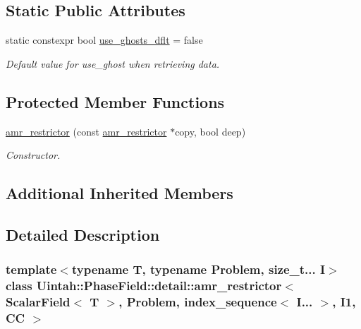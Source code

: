 \subsection*{Static Public Attributes}
\begin{DoxyCompactItemize}
\item 
static constexpr bool \hyperlink{classUintah_1_1PhaseField_1_1detail_1_1amr__restrictor_3_01ScalarField_3_01T_01_4_00_01Problem_0778720acc9a55f696b8537356a4dbcae_a4cae73002d40229c69caae07718b94d4}{use\+\_\+ghosts\+\_\+dflt} = false
\begin{DoxyCompactList}\small\item\em Default value for use\+\_\+ghost when retrieving data. \end{DoxyCompactList}\end{DoxyCompactItemize}
\subsection*{Protected Member Functions}
\begin{DoxyCompactItemize}
\item 
\hyperlink{classUintah_1_1PhaseField_1_1detail_1_1amr__restrictor_3_01ScalarField_3_01T_01_4_00_01Problem_0778720acc9a55f696b8537356a4dbcae_a660561d50c26f0cbed63979b4f04abca}{amr\+\_\+restrictor} (const \hyperlink{classUintah_1_1PhaseField_1_1detail_1_1amr__restrictor}{amr\+\_\+restrictor} $\ast$copy, bool deep)
\begin{DoxyCompactList}\small\item\em Constructor. \end{DoxyCompactList}\end{DoxyCompactItemize}
\subsection*{Additional Inherited Members}


\subsection{Detailed Description}
\subsubsection*{template$<$typename T, typename Problem, size\+\_\+t... I$>$\newline
class Uintah\+::\+Phase\+Field\+::detail\+::amr\+\_\+restrictor$<$ Scalar\+Field$<$ T $>$, Problem, index\+\_\+sequence$<$ I... $>$, I1, C\+C $>$}

